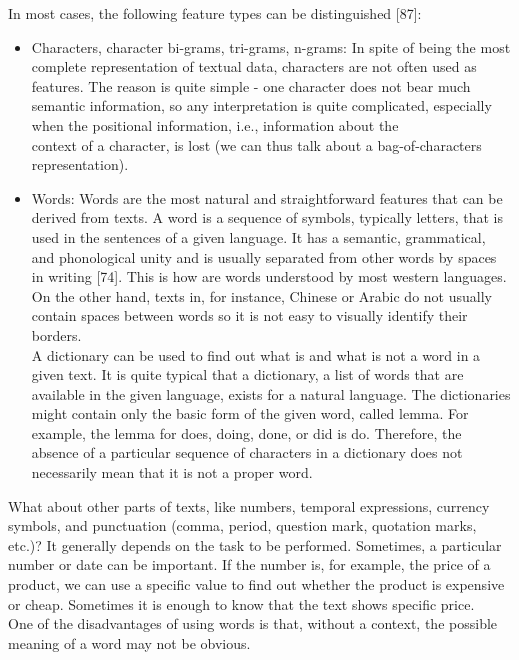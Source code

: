 \documentclass[10pt]{book}
\begin{document}
In most cases, the following feature types can be distinguished [87]:

\begin{itemize}
  \item Characters, character bi-grams, tri-grams, n-grams: In spite of being the most complete representation of textual data, characters are not often used as features. The reason is quite simple - one character does not bear much semantic information, so any interpretation is quite complicated, especially when the positional information, i.e., information about the\\
context of a character, is lost (we can thus talk about a bag-of-characters representation).
  \item Words: Words are the most natural and straightforward features that can be derived from texts. A word is a sequence of symbols, typically letters, that is used in the sentences of a given language. It has a semantic, grammatical, and phonological unity and is usually separated from other words by spaces in writing [74]. This is how are words understood by most western languages. On the other hand, texts in, for instance, Chinese or Arabic do not usually contain spaces between words so it is not easy to visually identify their borders.\\
A dictionary can be used to find out what is and what is not a word in a given text. It is quite typical that a dictionary, a list of words that are available in the given language, exists for a natural language. The dictionaries might contain only the basic form of the given word, called lemma. For example, the lemma for does, doing, done, or did is do. Therefore, the absence of a particular sequence of characters in a dictionary does not necessarily mean that it is not a proper word.
\end{itemize}

What about other parts of texts, like numbers, temporal expressions, currency symbols, and punctuation (comma, period, question mark, quotation marks, etc.)? It generally depends on the task to be performed. Sometimes, a particular number or date can be important. If the number is, for example, the price of a product, we can use a specific value to find out whether the product is expensive or cheap. Sometimes it is enough to know that the text shows specific price.\\
One of the disadvantages of using words is that, without a context, the possible meaning of a word may not be obvious.
\end{document}
